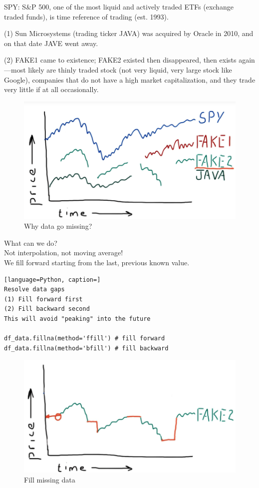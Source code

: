 \documentclass[12pt]{article}
\begin{document}
SPY: S\&P 500, one of the most liquid and actively traded ETFs (exchange traded funds), is time reference of trading (est. 1993).

(1) Sun Microsystems (trading ticker JAVA) was acquired by Oracle in 2010, and on that date JAVE went away.

(2) FAKE1 came to existence; FAKE2 existed then disappeared, then exists again---most likely are thinly traded stock (not very liquid, very large stock like Google), companies that do not have a high market capitalization, and they trade very little if at all occasionally.

\begin{figure}[!ht]
\centering
\includegraphics[scale=0.25]{fig/fig14}
\caption{Why data go missing?}
\end{figure}

\noindent
What can we do? \\
Not interpolation, not moving average! \\
We fill forward starting from the last, previous known value.

\begin{lstlisting}[language=Python, caption=]
Resolve data gaps
(1) Fill forward first
(2) Fill backward second
This will avoid "peaking" into the future

df_data.fillna(method='ffill') # fill forward
df_data.fillna(method='bfill') # fill backward
\end{lstlisting}

\begin{figure}[!ht]
\centering
\includegraphics[scale=0.25]{fig/fig15}
\caption{Fill missing data}
\end{figure}
\end{document}
